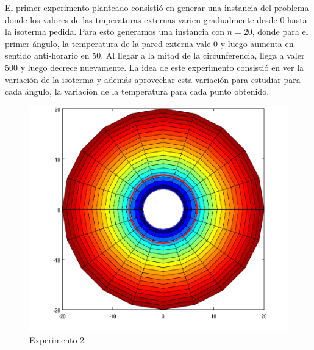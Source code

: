 El primer experimento planteado consistió en generar una instancia del problema donde los valores de las tmperaturas externas varien gradualmente desde 0 hasta la isoterma pedida. Para esto generamos una instancia con $n=20$, donde para el primer ángulo, la temperatura de la pared externa vale $0$ y luego aumenta en sentido anti-horario en 50. Al llegar a la mitad de la circunferencia, llega a valer 500 y luego decrece nuevamente. La idea de este experimento consistió en ver la variación de la isoterma y además aprovechar esta variación para estudiar para cada ángulo, la variación de la temperatura para cada punto obtenido.
\\
\begin{figure}
  \vspace{-20pt}
  \begin{center}
    \includegraphics[scale= 0.4]{imagenes/hornoInvertidColoroConIso.png}
  \end{center}
  \vspace{-20pt}
  \caption{Experimento 2}
  \vspace{-10pt}
  \label{fig:Exp1}
\end{figure}


